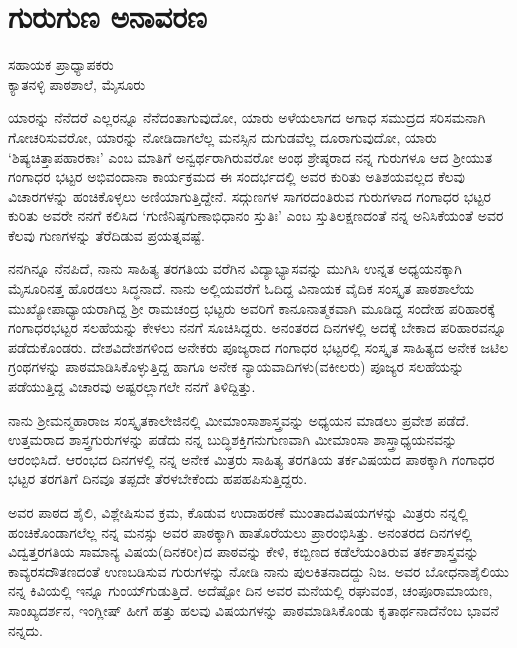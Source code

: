 {\fontsize{14}{16}\selectfont
\chapter{ಗುರುಗುಣ ಅನಾವರಣ}

\begin{center}
\smallskip
ಸಹಾಯಕ ಪ್ರಾಧ್ಯಾಪಕರು \\
ಕ್ಯಾತನಳ್ಳಿ ಪಾಠಶಾಲೆ, ಮೈಸೂರು
\addrule
\end{center}
ಯಾರನ್ನು ನೆನೆದರೆ ಎಲ್ಲರನ್ನೂ ನೆನೆದಂತಾಗುವುದೋ, ಯಾರು ಅಳೆಯಲಾಗದ ಅಗಾಧ ಸಮುದ್ರದ ಸರಿಸಮನಾಗಿ ಗೋಚರಿಸುವರೋ, ಯಾರನ್ನು ನೋಡಿದಾಗಲೆಲ್ಲ ಮನಸ್ಸಿನ ದುಗುಡವೆಲ್ಲ ದೂರಾಗುವುದೋ, ಯಾರು ‘ಶಿಷ್ಯಚಿತ್ತಾಪಹಾರಕಾಃ’ ಎಂಬ ಮಾತಿಗೆ ಅನ್ವರ್ಥರಾಗಿರುವರೋ ಅಂಥ ಶ್ರೇಷ್ಠರಾದ ನನ್ನ ಗುರುಗಳೂ ಆದ ಶ್ರೀಯುತ ಗಂಗಾಧರ ಭಟ್ಟರ ಅಭಿವಂದಾನಾ ಕಾರ್ಯಕ್ರಮದ ಈ ಸಂದರ್ಭದಲ್ಲಿ ಅವರ ಕುರಿತು ಅತಿಶಯವಲ್ಲದ ಕೆಲವು ವಿಚಾರಗಳನ್ನು ಹಂಚಿಕೊಳ್ಳಲು ಅಣಿಯಾಗುತ್ತಿದ್ದೇನೆ. ಸದ್ಗುಣಗಳ ಸಾಗರದಂತಿರುವ  ಗುರುಗಳಾದ ಗಂಗಾಧರ ಭಟ್ಟರ ಕುರಿತು ಅವರೇ ನನಗೆ ಕಲಿಸಿದ ‘ಗುಣಿನಿಷ್ಠಗುಣಾಭಿಧಾನಂ ಸ್ತುತಿಃ’ ಎಂಬ ಸ್ತುತಿಲಕ್ಷಣದಂತೆ ನನ್ನ ಅನಿಸಿಕೆಯಂತೆ ಅವರ ಕೆಲವು ಗುಣಗಳನ್ನು ತೆರೆದಿಡುವ ಪ್ರಯತ್ನವಷ್ಟೆ.

ನನಗಿನ್ನೂ ನೆನಪಿದೆ, ನಾನು ಸಾಹಿತ್ಯ ತರಗತಿಯ ವರೆಗಿನ ವಿದ್ಯಾಭ್ಯಾಸವನ್ನು ಮುಗಿಸಿ ಉನ್ನತ ಅಧ್ಯಯನಕ್ಕಾಗಿ ಮೈಸೂರಿನತ್ತ ಹೊರಡಲು ಸಿದ್ಧನಾದೆ. ನಾನು ಅಲ್ಲಿಯವರೆಗೆ ಓದಿದ್ದ ವಿನಾಯಕ ವೈದಿಕ ಸಂಸ್ಕೃತ ಪಾಠಶಾಲೆಯ ಮುಖ್ಯೋಪಾಧ್ಯಾಯರಾಗಿದ್ದ ಶ್ರೀ ರಾಮಚಂದ್ರ ಭಟ್ಟರು ಅವರಿಗೆ ಕಾನೂನಾತ್ಮಕವಾಗಿ ಮೂಡಿದ್ದ ಸಂದೇಹ ಪರಿಹಾರಕ್ಕೆ ಗಂಗಾಧರಭಟ್ಟರ ಸಲಹೆಯನ್ನು ಕೇಳಲು ನನಗೆ ಸೂಚಿಸಿದ್ದರು. ಅನಂತರದ ದಿನಗಳಲ್ಲಿ ಅದಕ್ಕೆ ಬೇಕಾದ ಪರಿಹಾರವನ್ನೂ  ಪಡೆದುಕೊಂಡರು. ದೇಶವಿದೇಶಗಳಿಂದ ಅನೇಕರು ಪೂಜ್ಯರಾದ ಗಂಗಾಧರ ಭಟ್ಟರಲ್ಲಿ ಸಂಸ್ಕೃತ ಸಾಹಿತ್ಯದ ಅನೇಕ ಜಟಿಲ ಗ್ರಂಥಗಳನ್ನು ಪಾಠಮಾಡಿಸಿಕೊಳ್ಳುತ್ತಿದ್ದ ಹಾಗೂ ಅನೇಕ ನ್ಯಾಯವಾದಿಗಳು(ವಕೀಲರು) ಪೂಜ್ಯರ ಸಲಹೆಯನ್ನು ಪಡೆಯುತ್ತಿದ್ದ ವಿಚಾರವು ಅಷ್ಟರಲ್ಲಾಗಲೇ ನನಗೆ ತಿಳಿದ್ದಿತ್ತು. 

ನಾನು ಶ್ರೀಮನ್ಮಹಾರಾಜ ಸಂಸ್ಕೃತಕಾಲೇಜಿನಲ್ಲಿ ಮೀಮಾಂಸಾಶಾಸ್ತ್ರವನ್ನು ಅಧ್ಯಯನ ಮಾಡಲು ಪ್ರವೇಶ ಪಡೆದೆ. ಉತ್ತಮರಾದ ಶಾಸ್ತ್ರಗುರುಗಳನ್ನು ಪಡೆದು ನನ್ನ ಬುದ್ಧಿಶಕ್ತಿಗನುಗುಣವಾಗಿ ಮೀಮಾಂಸಾ ಶಾಸ್ತ್ರಾಧ್ಯಯನವನ್ನು ಆರಂಭಿಸಿದೆ. ಆರಂಭದ ದಿನಗಳಲ್ಲಿ ನನ್ನ ಅನೇಕ ಮಿತ್ರರು ಸಾಹಿತ್ಯ ತರಗತಿಯ ತರ್ಕವಿಷಯದ ಪಾಠಕ್ಕಾಗಿ \hbox{ಗಂಗಾಧರ} ಭಟ್ಟರ ತರಗತಿಗೆ  ದಿನವೂ ತಪ್ಪದೇ  ತೆರಳಬೇಕೆಂದು ಹಪಹಪಿಸುತ್ತಿದ್ದರು.
\vskip 2pt

ಅವರ ಪಾಠದ ಶೈಲಿ, ವಿಶ್ಲೇಷಿಸುವ ಕ್ರಮ, ಕೊಡುವ ಉದಾಹರಣೆ ಮುಂತಾದ\break ವಿಷಯಗಳನ್ನು ಮಿತ್ರರು ನನ್ನಲ್ಲಿ ಹಂಚಿಕೊಂಡಾಗಲೆಲ್ಲ ನನ್ನ ಮನಸ್ಸು ಅವರ ಪಾಠಕ್ಕಾಗಿ ಹಾತೊರೆಯಲು ಪ್ರಾರಂಭಿಸಿತ್ತು. ಅನಂತರದ ದಿನಗಳಲ್ಲಿ ವಿದ್ವತ್ತರಗತಿಯ ಸಾಮಾನ್ಯ ವಿಷಯ(ದಿನಕರೀ)ದ ಪಾಠವನ್ನು ಕೇಳಿ, ಕಬ್ಬಿಣದ ಕಡೆಲೆಯಂತಿರುವ ತರ್ಕಶಾಸ್ತ್ರವನ್ನು ಕಾವ್ಯರಸದೌತಣದಂತೆ  ಉಣಬಡಿಸುವ ಗುರುಗಳನ್ನು ನೋಡಿ ನಾನು ಪುಲಕಿತ\-ನಾದದ್ದು ನಿಜ.  ಅವರ ಬೋಧನಾಶೈಲಿಯು ನನ್ನ ಕಿವಿಯಲ್ಲಿ ಇನ್ನೂ ಗುಂಯ್‍ಗುಡುತ್ತಿದೆ. ಅದೆಷ್ಟೋ ದಿನ ಅವರ ಮನೆಯಲ್ಲಿ ರಘುವಂಶ, ಚಂಪೂರಾಮಾಯಣ, ಸಾಂಖ್ಯ\-ದರ್ಶನ, ಇಂಗ್ಲೀಷ್ ಹೀಗೆ ಹತ್ತು ಹಲವು ವಿಷಯಗಳನ್ನು ಪಾಠಮಾಡಿಸಿಕೊಂಡು ಕೃತಾರ್ಥ\-ನಾದೆನೆಂಬ ಭಾವನೆ ನನ್ನದು.
\vskip 2pt

}
